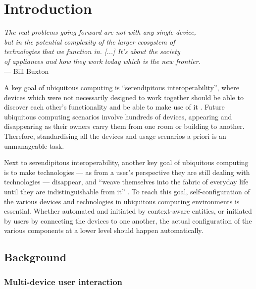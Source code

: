 \chapter{Introduction}
\label{Introduction}

\begin{flushright}{\slshape    
The real problems going forward are not with any single device, \\
but in the potential complexity of the larger ecosystem of \\
technologies that we function in. [...] It's about the society \\
of appliances and how they work today which is the new frontier.} \\ \medskip
    --- Bill Buxton \cite{Buxton2010}
\end{flushright}


A key goal of ubiquitous computing \cite{Weiser1991} is ``serendipitous interoperability'', where devices which were not necessarily designed to work together should be able to discover each other's functionality and be able to make use of it \cite{Owl2004}. Future ubiquitous computing scenarios involve hundreds of devices, appearing and disappearing as their owners carry them from one room or building to another. Therefore, standardising all the devices and usage scenarios a priori is an unmanageable task. 

Next to serendipitous interoperability, another key goal of ubiquitous computing is to make technologies --- as from a user's perspective they are still dealing with technologies --- disappear, and ``weave themselves into the fabric of everyday life until they are indistinguishable from it'' \cite{Weiser1991}. To reach this goal, self-configuration of the various devices and technologies in ubiquitous computing environments is essential. Whether automated and initiated by context-aware entities, or initiated by users by connecting the devices to one another, the actual configuration of the various components at a lower level should happen automatically.

\section{Background}

\subsection{Multi-device user interaction}

